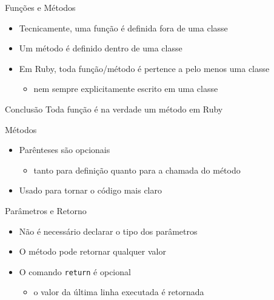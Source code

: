 
\begin{frame}[fragile,t]{Funções e Métodos}
  \begin{itemize}
    \item Tecnicamente, uma \alert{função} é definida \alert{fora} de uma classe
    \item Um \alert{método} é definido dentro de uma classe
    \item Em Ruby, \alert{toda} função/método é pertence a pelo menos uma classe
    \begin{itemize}
      \item nem sempre explicitamente escrito em uma classe
    \end{itemize}
  \end{itemize}   
  \begin{block}{Conclusão}
    Toda função é na verdade um método em Ruby  
  \end{block}
\end{frame}

\begin{frame}[fragile,t]{Métodos}
  \begin{itemize}
    \item Parênteses são \alert{opcionais}
    \begin{itemize}
      \item tanto para definição quanto para a chamada do método
    \end{itemize}
    \item Usado para tornar o código mais claro
  \end{itemize}
  
  
    
\end{frame}

\begin{frame}[fragile,t]{Parâmetros e Retorno}
  \begin{itemize}
    \item Não é necessário declarar o tipo dos parâmetros
    \item O método pode retornar qualquer valor
    \item O comando \verb!return! é opcional
    \begin{itemize}
      \item o valor da \alert{última linha} executada é retornada 
    \end{itemize}
  \end{itemize}
  
  
    
\end{frame}


